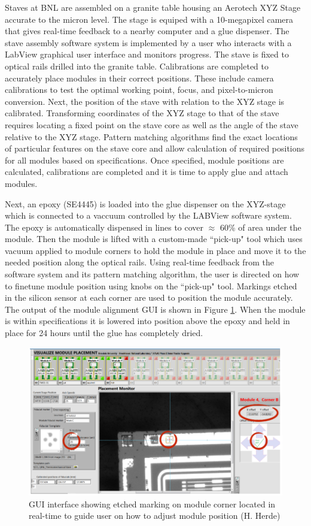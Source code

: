 Staves at BNL are assembled on a granite table housing an Aerotech XYZ Stage accurate to the micron level. The stage is equiped with a 10-megapixel camera that gives real-time feedback to a nearby computer and a glue dispenser. The stave assembly software system is implemented by a user who interacts with a LabView graphical user interface and monitors progress. The stave is fixed to optical rails drilled into the granite table. Calibrations are completed to accurately place modules in their correct positions. These include camera calibrations to test the optimal working point, focus, and pixel-to-micron conversion. Next, the position of the stave with relation to the XYZ stage is calibrated. Transforming coordinates of the XYZ stage to that of the stave requires locating a fixed point on the stave core as well as the angle of the stave relative to the XYZ stage. Pattern matching algorithms find the exact locations of particular features on the stave core and allow calculation of required positions for all modules based on specifications. Once specified, module positions are calculated, calibrations are completed and it is time to apply glue and attach modules. 

Next, an epoxy (SE4445) is loaded into the glue dispenser on the XYZ-stage which is connected to a vaccuum controlled by the LABView software system. The epoxy is automatically dispensed in lines to cover $\approx$ 60\% of area under the module. Then the module is lifted with a custom-made ``pick-up" tool which uses vacuum applied to module corners to hold the module in place and move it to the needed position along the optical rails. Using real-time feedback from the software system and its pattern matching algorithm, the user is directed on how to finetune module position using knobs on the ``pick-up" tool. Markings etched in the silicon sensor at each corner are used to position the module accurately. The output of the module alignment GUI is shown in Figure \ref{fig:modulealignment}. When the module is within specifications it is lowered into position above the epoxy and held in place for 24 hours until the glue has completely dried.

\begin{figure}[!h]
        \centering
    \includegraphics[width=.6\textwidth]{Pictures/labviewscreen.png}
    \caption{GUI interface showing etched marking on module corner located in real-time to guide user on how to adjust module position (H. Herde)}
    \label{fig:modulealignment}
\end{figure}

